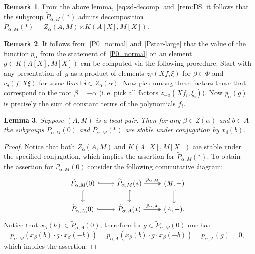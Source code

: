 \documentclass[oneside, 8pt]{amsart}
\newtheorem{lemma}{Lemma}
\theoremstyle{remark}
\theoremstyle{definition}
\numberwithin{lemma}{section}
\numberwithin{prop}{section}
\numberwithin{corollary}{section}
\numberwithin{externaltheorem}{section}
\newtheorem{rem}[lemma]{Remark}
\numberwithin{equation}{section}
\begin{document}
\begin{rem} \label{Pstar-char} From the above lemma,~\eqref{eq:sd-decomp} and~\cref{rem:DS} it follows that the subgroup $\widetilde{P}_{\alpha, M}(*)$ admits decomposition $\widetilde{P}_{\alpha, M}(*) = Z_\alpha(A, M) \ltimes K(A[X], M[X]).$ \end{rem} 

\begin{rem} \label{rem:palpha} It follows from~\cref{P0_normal} and~\cref{Pstar-large} that the value of the function $p_\alpha$ from the statement of~\cref{P0_normal} on an element $g\in K(A[X], M[X])$ can be computed via the following procedure. 
Start with any presentation of~$g$ as a product of elements $z_{\beta}(Xf, \xi)$ for $\beta \in \Phi$ and $c_\delta(f, X\xi)$ for some fixed $\delta\in Z_0(\alpha)$. 
Now pick among these factors those that correspond to the root $\beta = -\alpha$ (i.\,e. pick all factors $z_{-\alpha}(Xf_i, \xi_i)$). 
Now $p_\alpha(g)$ is precisely the sum of constant terms of the polynomials $f_i$. \end{rem}

\begin{lemma} \label{P0-conj-invariant} Suppose $(A, M)$ is a local pair. Then for any $\beta \in Z(\alpha)$ and $b \in A$ the subgroups $\widetilde{P}_{\alpha, M}(0)$ and $\widetilde{P}_{\alpha, M}(*)$ are stable under conjugation by $x_\beta(b)$. \end{lemma}
\begin{proof}
Notice that both $Z_\alpha(A, M)$ and $K(A[X], M[X])$ are stable under the specified conjugation, which implies the assertion for $\widetilde{P}_{\alpha, M}(*)$. 
To obtain the assertion for $\widetilde{P}_{\alpha, M}(0)$ consider the following commutative diagram:
\[\begin{tikzcd} \widetilde{P}_{\alpha, M}(0) \arrow[r, hookrightarrow] \arrow[d, hookrightarrow] & \widetilde{P}_{\alpha, M}(*) \arrow[r, "p_{\alpha, M}", twoheadrightarrow] \ar[d, hookrightarrow] & (M, +) \ar[d, hookrightarrow] \\ \widetilde{P}_{\alpha, A}(0) \ar[r, hookrightarrow] & \widetilde{P}_{\alpha, A}(*) \ar[r, "p_{\alpha, A}", twoheadrightarrow] & (A, +). \end{tikzcd} \]
Notice that $x_\beta(b) \in \widetilde{P}_{\alpha, A}(0)$, therefore for $g \in \widetilde{P}_{\alpha, M}(0)$ one has \[p_{\alpha, M}(x_\beta(b) \cdot g \cdot x_\beta(-b)) = p_{\alpha, A}(x_\beta(b) \cdot g \cdot x_\beta(-b)) = p_{\alpha, A}(g) = 0,\] which implies the assertion.\end{proof}
\end{document}

